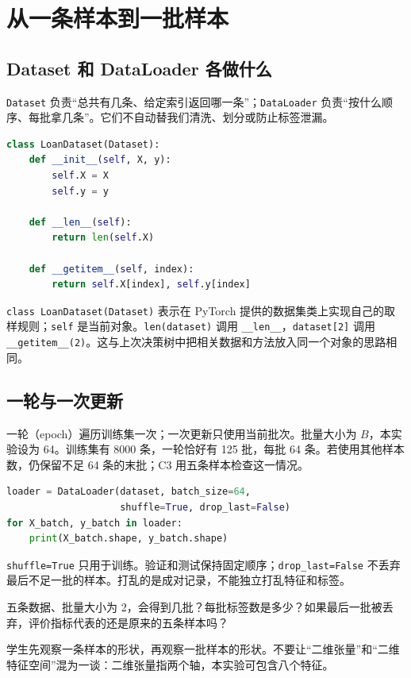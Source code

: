\documentclass[UTF8,a4paper,11pt,fontset=fandol]{ctexart}
\begin{document}
\section{从一条样本到一批样本}
\subsection{Dataset 和 DataLoader 各做什么}
\texttt{Dataset} 负责“总共有几条、给定索引返回哪一条”；\texttt{DataLoader} 负责“按什么顺序、每批拿几条”。它们不自动替我们清洗、划分或防止标签泄漏。
\begin{lstlisting}[language=Python]
class LoanDataset(Dataset):
    def __init__(self, X, y):
        self.X = X
        self.y = y

    def __len__(self):
        return len(self.X)

    def __getitem__(self, index):
        return self.X[index], self.y[index]
\end{lstlisting}
\texttt{class LoanDataset(Dataset)} 表示在 PyTorch 提供的数据集类上实现自己的取样规则；\texttt{self} 是当前对象。\texttt{len(dataset)} 调用 \texttt{\_\_len\_\_}，\texttt{dataset[2]} 调用 \texttt{\_\_getitem\_\_(2)}。这与上次决策树中把相关数据和方法放入同一个对象的思路相同。
\subsection{一轮与一次更新}
一轮（epoch）遍历训练集一次；一次更新只使用当前批次。批量大小为 $B$，本实验设为 64。训练集有 8000 条，一轮恰好有 125 批，每批 64 条。若使用其他样本数，仍保留不足 64 条的末批；C3 用五条样本检查这一情况。
\begin{lstlisting}[language=Python]
loader = DataLoader(dataset, batch_size=64,
                    shuffle=True, drop_last=False)
for X_batch, y_batch in loader:
    print(X_batch.shape, y_batch.shape)
\end{lstlisting}
\texttt{shuffle=True} 只用于训练。验证和测试保持固定顺序；\texttt{drop\_last=False} 不丢弃最后不足一批的样本。打乱的是成对记录，不能独立打乱特征和标签。
\begin{questionbox}
五条数据、批量大小为 2，会得到几批？每批标签数是多少？如果最后一批被丢弃，评价指标代表的还是原来的五条样本吗？
\end{questionbox}
\begin{teacherbox}[课堂提示]
学生先观察一条样本的形状，再观察一批样本的形状。不要让“二维张量”和“二维特征空间”混为一谈：二维张量指两个轴，本实验可包含八个特征。
\end{teacherbox}
\clearpage
\end{document}
